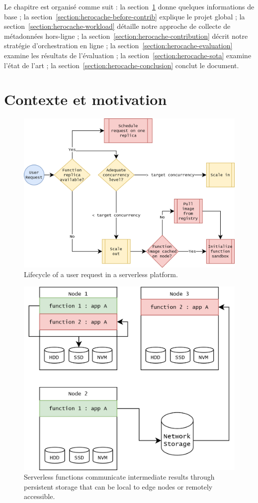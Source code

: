 Le chapitre est organisé comme suit : la section~\ref{section:herocache-background} donne quelques informations de base ; la section~\ref{section:herocache-before-contrib} explique le projet global ; la section~\ref{section:herocache-workload} détaille notre approche de collecte de métadonnées hors-ligne ; la section~\ref{section:herocache-contribution} décrit notre stratégie d'orchestration en ligne ; la section~\ref{section:herocache-evaluation} examine les résultats de l'évaluation ; la section~\ref{section:herocache-sota} examine l'état de l'art ; la section~\ref{section:herocache-conclusion} conclut le document.

\section{Contexte et motivation}
\label{section:herocache-background}

\begin{figure}[t]
\centering
\includegraphics[width=0.8\columnwidth]{5_Chapitre5/figures/function-cache.png}
\caption{Lifecycle of a user request in a serverless platform.}
\label{figure:herocache-function-cache}
\end{figure}

\begin{figure}[t]
\centering
\includegraphics[width=0.8\columnwidth]{5_Chapitre5/figures/function-communications.png}
\caption{Serverless functions communicate intermediate results through persistent storage that can be local to edge nodes or remotely accessible.}
\label{figure:herocache-function-communications}
\end{figure}

